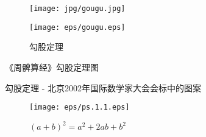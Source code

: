 \documentclass[main.tex]{subfiles}
\begin{document}
\begin{figure}[h]
\centering
\begin{minipage}{.45\textwidth}
	\centering
	\texttt{[image: jpg/gougu.jpg]}
\end{minipage}
\begin{minipage}{.45\textwidth}
	\centering
	\texttt{[image: eps/gougu.eps]}
\end{minipage}
\caption{勾股定理}
 \label{fig:1.5.1}
\end{figure}	

{《周髀算经》勾股定理图}

勾股定理 - 北京2002年国际数学家大会会标中的图案
\begin{figure}[h]
	\centering
	\texttt{[image: eps/ps.1.1.eps]}
	\caption{$(a+b)^2 = a^2 + 2ab + b^2$}
	\label{fig:chap1.5.3}
\end{figure}	
\end{document}
